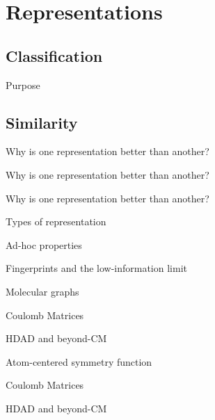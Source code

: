 
\section{Representations}
\subsection{Classification}
\begin{frame}[t]{Purpose}

\end{frame}

\subsection{Similarity}
\begin{frame}[t]{Why is one representation better than another?}

\end{frame}
\begin{frame}[t]{Why is one representation better than another?}

\end{frame}
\begin{frame}[t]{Why is one representation better than another?}

\end{frame}

\begin{frame}[t]{Types of representation}

\end{frame}
\begin{frame}[t]{Ad-hoc properties}

\end{frame}
\begin{frame}[t]{Fingerprints and the low-information limit}

\end{frame}
\begin{frame}[t]{Molecular graphs}

\end{frame}
\begin{frame}[t]{Coulomb Matrices}
%
\end{frame}
\begin{frame}[t]{HDAD and beyond-CM}
%
\end{frame}
\begin{frame}{Atom-centered symmetry function}
%
\end{frame}
\begin{frame}{Coulomb Matrices}

\end{frame}
\begin{frame}{HDAD and beyond-CM}

\end{frame}
%

